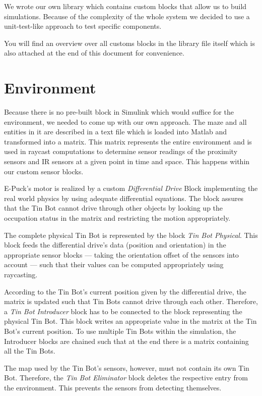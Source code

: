 \documentclass[a4paper,parskip,headheight=38pt]{scrartcl} %
\begin{document}
We wrote our own library which contains custom blocks that allow us to build simulations. Because of the complexity of the whole system we decided to use a unit-test-like approach to test specific components.

You will find an overview over all customs blocks in the library file itself which is also attached at the end of this document for convenience.

\section{Environment}
Because there is no pre-built block in Simulink which would suffice for the environment, we needed to come up with our own approach. The maze and all entities in it are described in a text file which is loaded into Matlab and transformed into a matrix. This matrix represents the entire environment and is used in raycast computations to determine sensor readings of the proximity sensors and IR sensors at a given point in time and space. This happens within our custom sensor blocks.

E-Puck's motor is realized by a custom \emph{Differential Drive} Block implementing the real world physics by using adequate differential equations. The block assures that the Tin Bot cannot drive through other objects by looking up the occupation status in the matrix and restricting the motion appropriately.

The complete physical Tin Bot is represented by the block \emph{Tin Bot Physical}. This block feeds the differential drive's data (position and orientation) in the appropriate sensor blocks — taking the orientation offset of the sensors into account — such that their values can be computed appropriately using raycasting.

According to the Tin Bot's current position given by the differential drive, the matrix is updated such that Tin Bots cannot drive through each other. Therefore, a \emph{Tin Bot Introducer} block has to be connected to the block representing the physical Tin Bot. This block writes an appropriate value in the matrix at the Tin Bot's current position. To use multiple Tin Bots within the simulation, the Introducer blocks are chained such that at the end there is a matrix containing all the Tin Bots.

The map used by the Tin Bot's sensors, however, must not contain its own Tin Bot. Therefore, the \emph{Tin Bot Eliminator} block deletes the respective entry from the environment. This prevents the sensors from detecting themselves.
\end{document}
